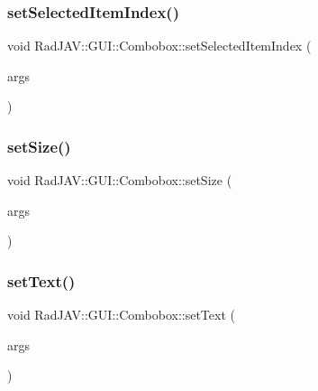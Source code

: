 \subsubsection{\texorpdfstring{set\+Selected\+Item\+Index()}{setSelectedItemIndex()}}
{\footnotesize\ttfamily void Rad\+J\+A\+V\+::\+G\+U\+I\+::\+Combobox\+::set\+Selected\+Item\+Index (\begin{DoxyParamCaption}\item[{const v8\+::\+Function\+Callback\+Info$<$ v8\+::\+Value $>$ \&}]{args }\end{DoxyParamCaption})\hspace{0.3cm}{\ttfamily [static]}}

\mbox{\label{class_rad_j_a_v_1_1_g_u_i_1_1_combobox_a5003e6dde08aa3dda3b08ba8cec08e0f}} 
\subsubsection{\texorpdfstring{set\+Size()}{setSize()}}
{\footnotesize\ttfamily void Rad\+J\+A\+V\+::\+G\+U\+I\+::\+Combobox\+::set\+Size (\begin{DoxyParamCaption}\item[{const v8\+::\+Function\+Callback\+Info$<$ v8\+::\+Value $>$ \&}]{args }\end{DoxyParamCaption})\hspace{0.3cm}{\ttfamily [static]}}

\mbox{\label{class_rad_j_a_v_1_1_g_u_i_1_1_combobox_a432bfea26e75f58dd364234b6adbb7a4}} 
\subsubsection{\texorpdfstring{set\+Text()}{setText()}}
{\footnotesize\ttfamily void Rad\+J\+A\+V\+::\+G\+U\+I\+::\+Combobox\+::set\+Text (\begin{DoxyParamCaption}\item[{const v8\+::\+Function\+Callback\+Info$<$ v8\+::\+Value $>$ \&}]{args }\end{DoxyParamCaption})\hspace{0.3cm}{\ttfamily [static]}}

